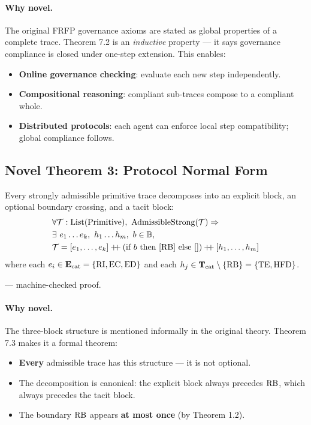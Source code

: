 \paragraph{Why novel.} The original FRFP governance axioms are stated as global
properties of a complete trace. Theorem 7.2 is an \emph{inductive} property ---
it says governance compliance is closed under one-step extension. This enables:
\begin{itemize}
  \item \textbf{Online governance checking}: evaluate each new step independently.
  \item \textbf{Compositional reasoning}: compliant sub-traces compose to a
        compliant whole.
  \item \textbf{Distributed protocols}: each agent can enforce local step
        compatibility; global compliance follows.
\end{itemize}

\subsection{Novel Theorem 3: Protocol Normal Form}

\begin{theorem}
Every strongly admissible primitive trace decomposes into an explicit block, an
optional boundary crossing, and a tacit block:
\begin{align*}
  &\forall \mathcal{T} : \mathrm{List}(\mathrm{Primitive}),\
  \mathrm{AdmissibleStrong}(\mathcal{T}) \Rightarrow \\
  &\exists\ e_1\ldots e_k,\ h_1\ldots h_m,\ b \in \mathbb{B}, \\
  &\mathcal{T}
  = [e_1,\ldots,e_k]
    \mathbin{+\!\!+}
    (\text{if } b \text{ then } [\mathrm{RB}] \text{ else } [])
    \mathbin{+\!\!+}
    [h_1,\ldots,h_m]
\end{align*}
where each $e_i \in \mathbf{E}_{\mathrm{cat}} = \{\mathrm{RI}, \mathrm{EC}, \mathrm{ED}\}$ and each
$h_j \in \mathbf{T}_{\mathrm{cat}} \setminus \{\mathrm{RB}\} = \{\mathrm{TE}, \mathrm{HFD}\}$.

--- machine-checked proof.
\end{theorem}

\paragraph{Why novel.} The three-block structure is mentioned informally in the
original theory. Theorem 7.3 makes it a formal theorem:
\begin{itemize}
  \item \textbf{Every} admissible trace has this structure --- it is not optional.
  \item The decomposition is canonical: the explicit block always precedes $\mathrm{RB}$,
        which always precedes the tacit block.
  \item The boundary $\mathrm{RB}$ appears \textbf{at most once} (by Theorem 1.2).
\end{itemize}

